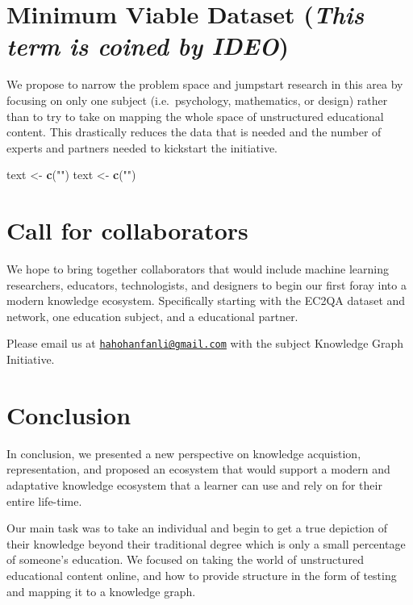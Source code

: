 \documentclass[]{book}
\newenvironment{Shaded}{\begin{snugshade}}{\end{snugshade}}
\newcommand{\KeywordTok}[1]{\textcolor[rgb]{0.13,0.29,0.53}{\textbf{#1}}}
\newcommand{\StringTok}[1]{\textcolor[rgb]{0.31,0.60,0.02}{#1}}
\newcommand{\NormalTok}[1]{#1}
\theoremstyle{definition}
\theoremstyle{definition}
\theoremstyle{definition}
\theoremstyle{remark}
\begin{document}
\section{\texorpdfstring{Minimum Viable Dataset (\emph{This term is
coined by
IDEO})}{Minimum Viable Dataset (This term is coined by IDEO)}}\label{minimum-viable-dataset-this-term-is-coined-by-ideo}

We propose to narrow the problem space and jumpstart research in this
area by focusing on only one subject (i.e.~psychology, mathematics, or
design) rather than to try to take on mapping the whole space of
unstructured educational content. This drastically reduces the data that
is needed and the number of experts and partners needed to kickstart the
initiative.

\begin{Shaded}
\begin{Highlighting}[]
\NormalTok{text <-}\StringTok{ }\KeywordTok{c}\NormalTok{(}\StringTok{""}\NormalTok{)}
\NormalTok{text <-}\StringTok{ }\KeywordTok{c}\NormalTok{(}\StringTok{""}\NormalTok{)}
\end{Highlighting}
\end{Shaded}

\section{Call for collaborators}\label{call-for-collaborators}

We hope to bring together collaborators that would include machine
learning researchers, educators, technologists, and designers to begin
our first foray into a modern knowledge ecosystem. Specifically starting
with the EC2QA dataset and network, one education subject, and a
educational partner.

Please email us at
\href{mailto:hahohanfanli@gmail.com}{\nolinkurl{hahohanfanli@gmail.com}}
with the subject Knowledge Graph Initiative.

\section{Conclusion}\label{conclusion}

In conclusion, we presented a new perspective on knowledge acquistion,
representation, and proposed an ecosystem that would support a modern
and adaptative knowledge ecosystem that a learner can use and rely on
for their entire life-time.

Our main task was to take an individual and begin to get a true
depiction of their knowledge beyond their traditional degree which is
only a small percentage of someone's education. We focused on taking the
world of unstructured educational content online, and how to provide
structure in the form of testing and mapping it to a knowledge graph.
\end{document}
